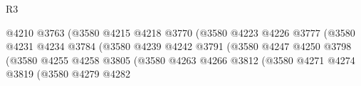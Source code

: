 \begin{lexlean}{R3}
\begin{coremodule}
                                                        @4210
                                                        @3763
                                                        (@3580
                                                          @4215
                                                          @4218
                                                          @3770
                                                          (@3580
                                                            @4223
                                                            @4226
                                                            @3777
                                                            (@3580
                                                              @4231
                                                              @4234
                                                              @3784
                                                              (@3580
                                                                @4239
                                                                @4242
                                                                @3791
                                                                (@3580
                                                                  @4247
                                                                  @4250
                                                                  @3798
                                                                  (@3580
                                                                    @4255
                                                                    @4258
                                                                    @3805
                                                                    (@3580
                                                                      @4263
                                                                      @4266
                                                                      @3812
                                                                      (@3580
                                                                        @4271
                                                                        @4274
                                                                        @3819
                                                                        (@3580
                                                                          @4279
                                                                          @4282

\end{coremodule}
\end{lexlean}
